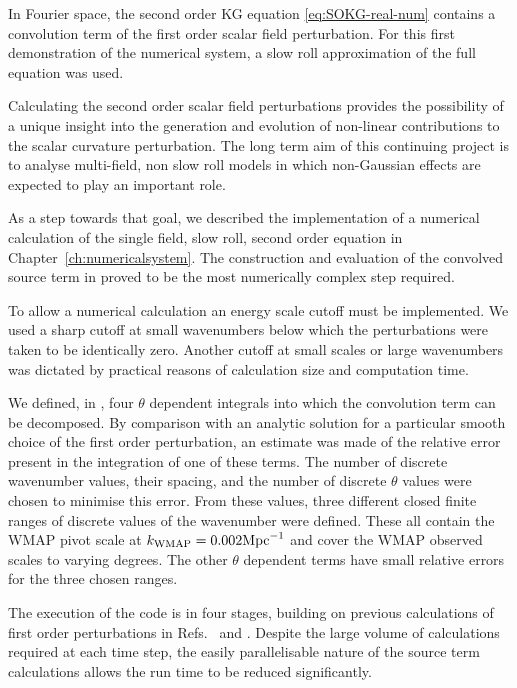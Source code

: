 In Fourier space, the second order KG equation \eqref{eq:SOKG-real-num} contains a
convolution term of the first order scalar field perturbation. For this first
demonstration of the numerical system, a slow roll approximation of the full
equation was used. 

Calculating the second order scalar field perturbations provides the possibility of
a unique insight into the generation and evolution of non-linear contributions to
the scalar curvature perturbation. The long term aim of this continuing project is
to analyse multi-field, non slow roll models in which non-Gaussian effects are
expected to play an important role.

As a step towards that goal, we described the implementation of a numerical
calculation of the single field, slow roll, second order equation in
Chapter~\ref{ch:numericalsystem}. The construction and evaluation of the convolved
source term in  proved to be the most numerically complex
step required. 

To allow a numerical calculation an energy scale cutoff must be implemented. We used
a sharp cutoff at small wavenumbers below which the perturbations were taken to be
identically zero. Another cutoff at small scales or large wavenumbers was dictated
by practical reasons of calculation size and computation time.

We defined, in , four $\theta$ dependent integrals
into which the convolution term can be decomposed. By comparison with an analytic
solution for a particular smooth choice of the first order perturbation, an estimate
was made of the relative error present in the integration of one of these terms. The
number of discrete wavenumber values, their spacing, and the number of discrete
$\theta$ values were chosen to minimise this error. From these values, three
different closed finite ranges of discrete values of the wavenumber were defined.
These all contain the WMAP pivot scale at $k_\mathrm{WMAP}=0.002\mathrm{Mpc}^{-1}$ and cover the
WMAP observed scales to varying degrees.
% 
The other $\theta$ dependent terms have small relative errors for the three chosen
ranges. 



The execution of the code is in four stages, building on previous calculations of
first order perturbations in Refs.~\cite{Martin:2006rs, Ringeval:2007am} and
\cite{Salopek:1988qh}. Despite the large volume of calculations required at each
time step, the easily parallelisable nature of the source term calculations allows
the run time to be reduced significantly.


